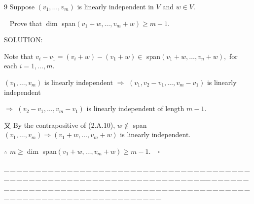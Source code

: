 \documentclass[a4paper, 11pt, UTF8]{article}
\begin{document}
\begin{large}
{\timesbf\Large 9} {\timessl\Large 
Suppose $(v_1,\dots,v_m)$ is linearly independent in $V$ and $w\in V$.}\par\,\,\,
{\timessl\Large Prove that $\dim$ span$(v_1+w,\dots,v_m+w)\geq m-1$.}\par
{\timesbf S\footnotesize{OLUTION:}}\par\quad
Note that $v_i-v_1=(v_i+w)-(v_1+w)\in$ span$(v_1+w,\dots,v_n+w),$ for each $i=1,\dots,m$.\par\quad
$(v_1,\dots,v_m)$ is linearly independent $\Rightarrow$ $(v_1,v_2-v_1,\dots,v_m-v_1)$ is linearly independent\par\quad
$\Rightarrow$ $(v_2-v_1,\dots,v_m-v_1)$ is linearly independent of length $m-1$.\par\quad
又 By the contrapositive of (2.A.10), $w\not\in$ span$(v_1,\dots,v_m)\Rightarrow (v_1+w,\dots,v_m+w)$ is linearly independent.\par\quad
$\therefore\,\,m\geq\dim$ span$(v_1+w,\dots,v_m+w)\geq m-1.\,\,\,\,\,\,\square$
\par
{\tiny \_\,\_\,\_\,\_\,\_\,\_\,\_\,\_\,\_\,\_\,\_\,\_\,\_\,\_\,\_\,\_\,\_\,\_\,\_\,\_\,\_\,\_\,\_\,\_\,\_\,\_\,\_\,\_\,\_\,\_\,\_\,\_\,\_\,\_\,\_\,\_\,\_\,\_\,\_\,\_\,\_\,\_\,\_\,\_\,\_\,\_\,\_\,\_\,\_\,\_\,\_\,\_\,\_\,\_\,\_\,\_\,\_\,\_\,\_\,\_\,\_\,\_\,\_\,\_\,\_\,\_\,\_\,\_\,\_\,\_\,\_\_\,\_\,\_\,\_\,\_\,\_\,\_\,\_\,\_\,\_\,\_\,\_\,\_\,\_\,\_\,\_\,\_\,\_\,\_\,\_\,\_\,\_\,\_\,\_\,\_\,\_\,\_\,\_\,\_\,\_\,\_\,\_\,\_\,\_\,\_\,\_\,\_\,\_\,\_\,\_\,\_\,\_\,\_\,\_\,\_\,\_\,\_\,\_\,\_\,\_\,\_\,\_\,\_\,\_\,\_\,\_\,\_\,\_\,\_\,\_\,\_\,\_\,\_\,\_\,\_\,\_\,\_\,\_\,\_\,\_\,\_}{\tiny\,\par}


\end{large}
\end{document}

